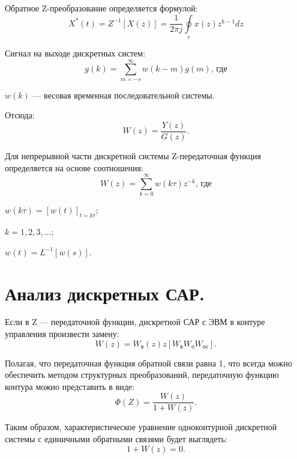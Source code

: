 \documentclass[unicode, 12pt, a4paper, oneside]{article}
\begin{document}
Обратное Z-преобразование определяется формулой:
\begin{equation}
X^*(t) = Z^{-1} [X(z)] = \dfrac{1}{2\pi j} \oint\limits_r x(z) z^{k -1} dz
\end{equation}

Сигнал на выходе дискретных систем:
\begin{equation}
g(k) = \sum_{m=-s}^{\infty} w(k - m)g(m)\text{, где}
\end{equation}
\par $ w(k) $ --- весовая временная последовательной системы.

Отсюда:
\begin{equation}
W(z) = \dfrac{Y(z)}{G(z)}.
\end{equation}

Для непрерывной части дискретной системы Z-передаточная функция определяется на основе соотношения:
\begin{equation}
W(z) = \sum_{k=0}^{\infty} w(k\tau) z^{-k} \text{, где}
\end{equation}
\par $ w(k\tau) = [w(t)]_{t=k\tau} $;\nopagebreak
\par $ k = 1, 2, 3, \ldots $;
\par $ w(t) = L^{-1} [w(s)] $.

\section{Анализ дискретных САР.}

Если в Z --- передаточной функции, дискретной САР с ЭВМ в контуре управления произвести замену:
\begin{equation}
W(z) = W_\text{в}(z) z[W_\text{в} W_\text{о} W_\text{ос}].
\end{equation}

Полагая, что передаточная функция обратной связи равна 1, что всегда можно обеспечить методом структурных преобразований, передаточную функцию контура можно представить в виде:
\begin{equation}
\Phi(Z) = \dfrac{W(z)}{1 + W(z)}.
\end{equation}

Таким образом, характеристическое уравнение одноконтурной дискретной системы с единичными обратными связями будет выглядеть:
\begin{equation}
1 + W(z) = 0.
\end{equation}
\end{document}
